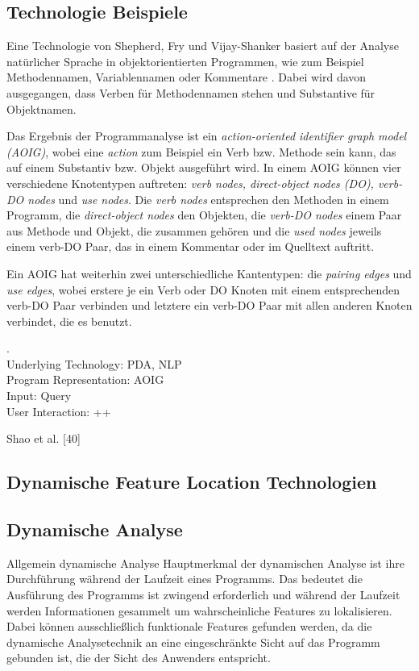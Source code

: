 \documentclass[runningheads,a4paper]{llncs}
\begin{document}
\subsection*{Technologie Beispiele}

Eine Technologie von Shepherd, Fry und Vijay-Shanker basiert auf der Analyse natürlicher Sprache in objektorientierten Programmen, wie zum Beispiel Methodennamen, Variablennamen oder Kommentare \cite{shepherd}. Dabei wird davon ausgegangen, dass Verben für Methodennamen stehen und Substantive für Objektnamen.

Das Ergebnis der Programmanalyse ist ein \textit{action-oriented identifier graph model (AOIG)}, wobei eine \textit{action} zum Beispiel ein Verb bzw. Methode sein kann, das auf einem Substantiv bzw. Objekt ausgeführt wird. In einem AOIG können vier verschiedene Knotentypen auftreten: \textit{verb nodes, direct-object nodes (DO), verb-DO nodes} und \textit{use nodes}. Die \textit{verb nodes} entsprechen den Methoden in einem Programm, die \textit{direct-object nodes} den Objekten, die \textit{verb-DO nodes} einem Paar aus Methode und Objekt, die zusammen gehören und die \textit{used nodes} jeweils einem verb-DO Paar, das in einem Kommentar oder im Quelltext auftritt.

Ein AOIG hat weiterhin zwei unterschiedliche Kantentypen: die \textit{pairing edges} und \textit{use edges}, wobei erstere je ein Verb oder DO Knoten mit einem entsprechenden verb-DO Paar verbinden und letztere ein verb-DO Paar mit allen anderen Knoten verbindet, die es benutzt.

.\\
Underlying Technology: PDA, NLP\\
Program Representation: AOIG\\
Input: Query\\
User Interaction: ++

Shao et al. [40]

\subsection{Dynamische Feature Location Technologien}


\subsection*{Dynamische Analyse}
Allgemein dynamische Analyse
Hauptmerkmal der dynamischen Analyse ist ihre Durchführung während der Laufzeit eines Programms. Das bedeutet die Ausführung des Programms ist zwingend erforderlich und während der Laufzeit werden Informationen gesammelt um wahrscheinliche Features zu lokalisieren. Dabei können ausschließlich funktionale Features gefunden werden, da die dynamische Analysetechnik an eine eingeschränkte Sicht auf das Programm gebunden ist, die der Sicht des Anwenders entspricht. 
\end{document}
